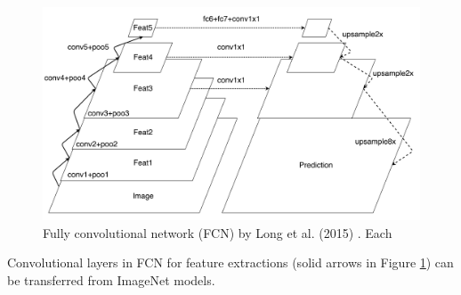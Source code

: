 
\begin{figure}[t]
\centering
   \includegraphics[width=\linewidth]{img/fcn}
\caption{Fully convolutional network (FCN) by Long et al. (2015)  \cite{long2015fully}.
Each }
\label{fig:fcn}
\end{figure}


Convolutional layers in FCN for feature extractions (solid arrows in Figure \ref{fig:fcn}) can be transferred from ImageNet models.
